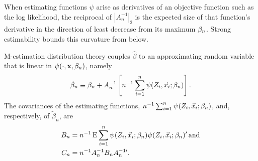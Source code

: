 \documentclass{article}
\theoremstyle{remark}
\begin{document}
When estimating functions $\psi$ arise as derivatives of an objective function such as the log likelihood, the reciprocal of $|{A}_{n}^{-1}|_{2}$ is the expected size of that function's derivative in the direction of least decrease from its maximum $\beta_{n }$. 
Strong estimability bounds this curvature from below.

M-estimation distribution theory couples $\hat\beta$ to an approximating random variable that is linear in $\psi(\cdot, \mathbf{x}, \beta_{n })$, namely 
\begin{equation}
  \label{eq:22}
  \tilde{\beta}_{n} \equiv \beta_{n } + A_{n}^{-1} \left[n^{-1}\sum_{i=1}^{n} \psi(Z_{i}, \vec{x}_{i}; \beta_{n } )\right].  
\end{equation}
The covariances of the estimating functions, $n^{-1} \sum_{i=1}^{n} \psi(Z_{i}, \vec{x}_{i}; \beta_{n } )$, and, respectively, of $\tilde{\beta}_{n}$, are 
\begin{align}
\label{eq:13}
B_{n}  &=  n^{-1}\operatorname{E}  \sum_{i=1}^{n} \psi(Z_{i}, \vec{x}_{i}; \beta_{n } ) \psi(Z_{i}, \vec{x}_{i};  \beta_{n } )' \, \mathrm{and} \\
C_{n} &= n^{-1}A_{n}^{-1}B_{n}A_{n}^{-1\prime}.\nonumber
\end{align}
\end{document}
